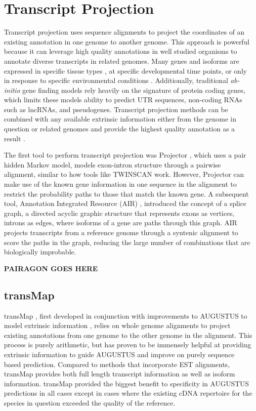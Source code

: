 \documentclass[fleqn,10pt]{wlscirep}
\begin{document}
\section*{Transcript Projection}

Transcript projection uses sequence alignments to project the coordinates of an existing annotation in one genome to another genome. This approach is powerful because it can leverage high quality annotations in well studied organisms to annotate diverse transcripts in related genomes. Many genes and isoforms are expressed in specific tissue types \cite{gtex2015genotype}, at specific developmental time points, or only in response to specific environmental conditions \cite{peng2011integrative}. Additionally, traditional \textit{ab-initio} gene finding models rely heavily on the signature of protein coding genes, which limits these models ability to predict UTR sequences, non-coding RNAs such as lncRNAs, and pseudogenes. Transcript projection methods can be combined with any available extrinsic information either from the genome in question or related genomes and provide the highest quality annotation as a result \cite{stanke2008using}.

The first tool to perform transcript projection was Projector \cite{meyer2004gene}, which uses a pair hidden Markov model, models exon-intron structure through a pairwise alignment, similar to how tools like TWINSCAN work. However, Projector can make use of the known gene information in one sequence in the alignment to restrict the probability paths to those that match the known gene. A subsequent tool, Annotation Integrated Resource (AIR) \cite{florea2005gene}, introduced the concept of a splice graph, a directed acyclic graphic structure that represents exons as vertices, introns as edges, where isoforms of a gene are paths through this graph. AIR projects transcripts from a reference genome through a syntenic alignment to score the paths in the graph, reducing the large number of combinations that are biologically improbable. 

\textbf{PAIRAGON GOES HERE}

\subsection*{transMap}
transMap \cite{stanke2008using}, first developed in conjunction with improvements to AUGUSTUS to model extrinsic information \cite{stanke2004augustus}, relies on whole genome alignments to project existing annotations from one genome to the other genome in the alignment. This process is purely arithmetic, but has proven to be immensely helpful at providing extrinsic information to guide AUGUSTUS and improve on purely sequence based prediction. Compared to methods that incorporate EST alignments, transMap provides both full length transcript information as well as isoform information. transMap provided the biggest benefit to specificity in AUGUSTUS predictions in all cases except in cases where the existing cDNA repertoire for the species in question exceeded the quality of the reference.
\end{document}
